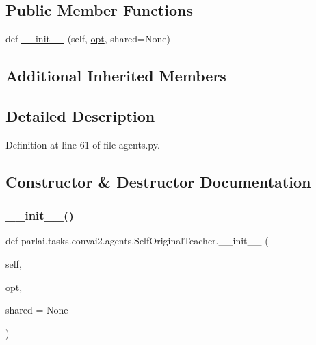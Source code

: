 \subsection*{Public Member Functions}
\begin{DoxyCompactItemize}
\item 
def \hyperlink{classparlai_1_1tasks_1_1convai2_1_1agents_1_1SelfOriginalTeacher_abcdf7f07251be2d5f52cd095c50d2fac}{\+\_\+\+\_\+init\+\_\+\+\_\+} (self, \hyperlink{classparlai_1_1core_1_1teachers_1_1FbDialogTeacher_af7a9ec497b9cd0292d7b8fa220da7c28}{opt}, shared=None)
\end{DoxyCompactItemize}
\subsection*{Additional Inherited Members}


\subsection{Detailed Description}


Definition at line 61 of file agents.\+py.



\subsection{Constructor \& Destructor Documentation}
\mbox{\label{classparlai_1_1tasks_1_1convai2_1_1agents_1_1SelfOriginalTeacher_abcdf7f07251be2d5f52cd095c50d2fac}} 
\subsubsection{\texorpdfstring{\+\_\+\+\_\+init\+\_\+\+\_\+()}{\_\_init\_\_()}}
{\footnotesize\ttfamily def parlai.\+tasks.\+convai2.\+agents.\+Self\+Original\+Teacher.\+\_\+\+\_\+init\+\_\+\+\_\+ (\begin{DoxyParamCaption}\item[{}]{self,  }\item[{}]{opt,  }\item[{}]{shared = {\ttfamily None} }\end{DoxyParamCaption})}



